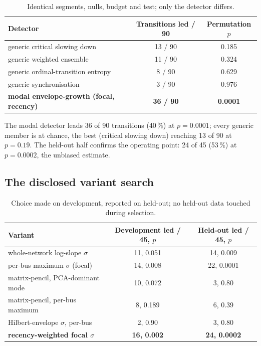 \documentclass[11pt]{article}
\begin{document}
\begin{table}[h!]
\centering
\begin{tabular}{lcc}
\toprule
Detector & Transitions led / 90 & Permutation $p$ \\
\midrule
generic critical slowing down & 13 / 90 & 0.185 \\
generic weighted ensemble & 11 / 90 & 0.324 \\
generic ordinal-transition entropy & 8 / 90 & 0.629 \\
generic synchronisation & 3 / 90 & 0.976 \\
\textbf{modal envelope-growth (focal, recency)} & \textbf{36 / 90} & \textbf{0.0001} \\
\bottomrule
\end{tabular}
\caption{Identical segments, nulls, budget and test; only the detector
differs.}
\label{tab:headtohead}
\end{table}

The modal detector leads 36 of 90 transitions (40\,\%) at $p = 0.0001$;
every generic member is at chance, the best (critical slowing down)
reaching 13 of 90 at $p = 0.19$. The held-out half confirms the
operating point: 24 of 45 (53\,\%) at $p = 0.0002$, the unbiased
estimate.

\subsection{The disclosed variant search}\label{sec:variants}

\begin{table}[h!]
\centering
\small
\begin{tabular}{lcc}
\toprule
Variant & Development led / 45, $p$ & Held-out led / 45, $p$ \\
\midrule
whole-network log-slope $\sigma$ & 11, 0.051 & 14, 0.009 \\
per-bus maximum $\sigma$ (focal) & 14, 0.008 & 22, 0.0001 \\
matrix-pencil, PCA-dominant mode & 10, 0.072 & 3, 0.80 \\
matrix-pencil, per-bus maximum & 8, 0.189 & 6, 0.39 \\
Hilbert-envelope $\sigma$, per-bus & 2, 0.90 & 3, 0.80 \\
\textbf{recency-weighted focal $\sigma$} & \textbf{16, 0.002} & \textbf{24, 0.0002} \\
\bottomrule
\end{tabular}
\caption{Choice made on development, reported on held-out; no held-out
data touched during selection.}
\label{tab:variants}
\end{table}
\end{document}
